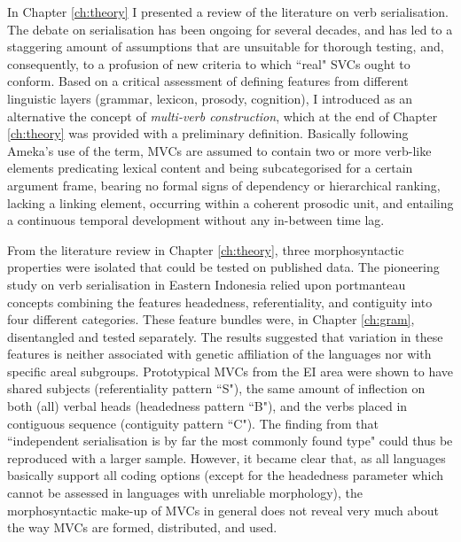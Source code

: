 In Chapter \ref{ch:theory} I presented a review of the literature on verb serialisation. The debate on serialisation has been ongoing for several decades, and has led to a staggering amount of assumptions that are unsuitable for thorough testing, and, consequently, to a profusion of new criteria to which ``real" SVCs ought to conform. Based on a critical assessment of defining features from different linguistic layers (grammar, lexicon, prosody, cognition), I introduced as an alternative the concept of \textit{multi-verb construction}, which at the end of Chapter \ref{ch:theory} was provided with a preliminary definition. Basically following Ameka's use of the term, MVCs are assumed to contain two or more verb-like elements predicating lexical content and being subcategorised for a certain argument frame, bearing no formal signs of dependency or hierarchical ranking, lacking a linking element, occurring within a coherent prosodic unit, and entailing a continuous temporal development without any in-between time lag.

From the literature review in Chapter \ref{ch:theory}, three morphosyntactic properties were isolated that could be tested on published data. The pioneering study on verb serialisation in Eastern Indonesia \citep{vanstaden2008serial} relied upon portmanteau concepts combining the features headedness, referentiality, and contiguity into four different categories. These feature bundles were, in Chapter \ref{ch:gram}, disentangled and tested separately. The results suggested that variation in these features is neither associated with genetic affiliation of the languages nor with specific areal subgroups. Prototypical MVCs from the EI area were shown to have shared subjects (referentiality pattern ``S"), the same amount of inflection on both (all) verbal heads (headedness pattern ``B"), and the verbs placed in contiguous sequence (contiguity pattern ``C"). The finding from \citet[48]{vanstaden2008serial} that ``independent serialisation is by far the most commonly found type" could thus be reproduced with a larger sample. However, it became clear that, as all languages basically support all coding options (except for the headedness parameter which cannot be assessed in languages with unreliable morphology), the morphosyntactic make-up of MVCs in general does not reveal very much about the way MVCs are formed, distributed, and used.

